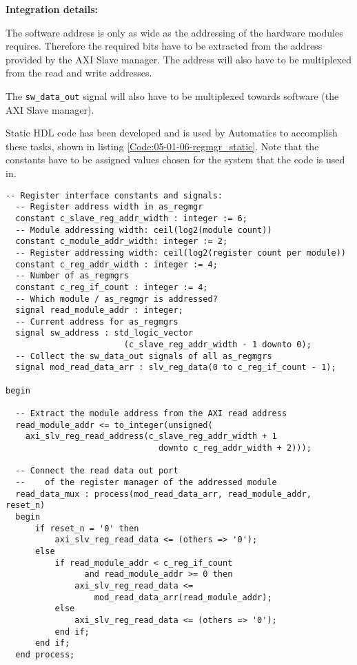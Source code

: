 \textbf{Integration details:}

The software address is only as wide as the addressing of the hardware modules requires.
Therefore the required bits have to be extracted from the address provided by the AXI Slave manager.
The address will also have to be multiplexed from the read and write addresses.

The \texttt{sw\_data\_out} signal will also have to be multiplexed towards software (the AXI Slave manager).

Static HDL code has been developed and is used by Automatics to accomplish these tasks, shown in listing \ref{Code:05-01-06-regmgr_static}.
Note that the constants have to be assigned values chosen for the system that the code is used in.

\begin{lstlisting}[style=hdl, label=Code:05-01-06-regmgr_static, caption=Static code used to manage multiple \texttt{as\_regmgr} modules]
  -- Register interface constants and signals:
  -- Register address width in as_regmgr
  constant c_slave_reg_addr_width : integer := 6;
  -- Module addressing width: ceil(log2(module count))
  constant c_module_addr_width: integer := 2;
  -- Register addressing width: ceil(log2(register count per module))
  constant c_reg_addr_width : integer := 4;
  -- Number of as_regmgrs
  constant c_reg_if_count : integer := 4;
  -- Which module / as_regmgr is addressed?  
  signal read_module_addr : integer;
  -- Current address for as_regmgrs
  signal sw_address : std_logic_vector
                        (c_slave_reg_addr_width - 1 downto 0);
  -- Collect the sw_data_out signals of all as_regmgrs
  signal mod_read_data_arr : slv_reg_data(0 to c_reg_if_count - 1);

begin

  -- Extract the module address from the AXI read address
  read_module_addr <= to_integer(unsigned(
    axi_slv_reg_read_address(c_slave_reg_addr_width + 1 
                               downto c_reg_addr_width + 2)));

  -- Connect the read data out port
  --    of the register manager of the addressed module
  read_data_mux : process(mod_read_data_arr, read_module_addr, reset_n)
  begin
      if reset_n = '0' then
          axi_slv_reg_read_data <= (others => '0');
      else
          if read_module_addr < c_reg_if_count 
                and read_module_addr >= 0 then
              axi_slv_reg_read_data <= 
                  mod_read_data_arr(read_module_addr);
          else
              axi_slv_reg_read_data <= (others => '0');
          end if;
      end if;
  end process;


\end{lstlisting}
